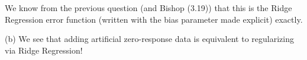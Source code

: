 \documentclass[11pt,letterpaper]{article}
\begin{document}
\begin{enumerate}
We know from the previous question (and Bishop (3.19)) that this is the Ridge Regression error function (written with the bias parameter made explicit) exactly.

(b) We see that adding artificial zero-response data is equivalent to regularizing via Ridge Regression!




\end{enumerate}
\end{document}

